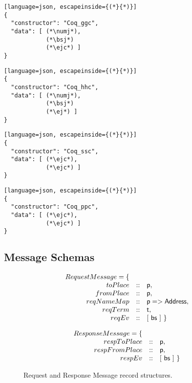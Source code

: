 \begin{lstlisting}[language=json, escapeinside={(*}{*)}]
{
  "constructor": "Coq_ggc",
  "data": [ (*\numj*),
            (*\bsj*)
            (*\ejc*) ]
}
\end{lstlisting}

\begin{lstlisting}[language=json, escapeinside={(*}{*)}]
{
  "constructor": "Coq_hhc",
  "data": [ (*\numj*),
            (*\bsj*)
            (*\ej*) ]
}
\end{lstlisting}

\newpage

\begin{lstlisting}[language=json, escapeinside={(*}{*)}]
{
  "constructor": "Coq_ssc",
  "data": [ (*\ejc*),
            (*\ejc*) ]
}
\end{lstlisting}

\begin{lstlisting}[language=json, escapeinside={(*}{*)}]
{
  "constructor": "Coq_ppc",
  "data": [ (*\ejc*),
            (*\ejc*) ]
}
\end{lstlisting}


\newcommand{\mapadd}{\ensuremath{p => Address}}

\subsection{Message Schemas}


\begin{figure}

\[\begin{array}{rcl}
      RequestMessage = \{\\
      toPlace &:: &\cnc{p},\\
      fromPlace &:: &\cnc{p},\\
      reqNameMap &:: &\cnc{\mapadd},\\
      reqTerm &:: &\cnc{t},\\
      reqEv &:: &[~\bs~]~\}
  \end{array}\]

\[\begin{array}{rcl}
      ResponseMessage = \{\\
      respToPlace &:: &\mathsf{p},\\
      respFromPlace &:: &\mathsf{p},\\
      respEv &:: &[~\mathsf{bs}~]~\}
  \end{array}\]

  \caption{Request and Response Message record structures.}\label{fig:messages-grammar}
\end{figure}


